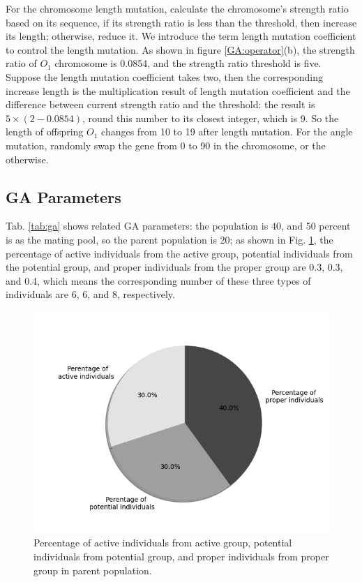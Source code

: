 For the chromosome length mutation, calculate the chromosome's strength ratio
based on its sequence, if its strength ratio is less than the threshold, then
increase its length; otherwise, reduce it. We introduce the term length
mutation coefficient to control the length mutation.  As shown in figure
\ref{GA:operator}(b), the strength ratio of $O_1$ chromosome is 0.0854, and the
strength ratio threshold is five. Suppose the length mutation coefficient takes
two, then the corresponding increase length is the multiplication result of
length mutation coefficient and the difference between current strength ratio
and the threshold: the result is $5\times(2-0.0854)$, round this number to its
closest integer, which is 9. So the length of offspring $O_1$ changes from 10
to 19 after length mutation.  For the angle mutation, randomly swap the gene
from 0 to 90 in the chromosome, or the otherwise.


\subsection{GA Parameters}
Tab. \ref{tab:ga} shows related GA parameters: the population is 40, and 50
percent is as the mating pool, so the parent population is 20; as
shown in Fig. \ref{fig:percentage}, the percentage of active individuals from
the active group, potential individuals from the potential group, and proper
individuals from the proper group are 0.3, 0.3, and 0.4, which means the
corresponding number of these three types of individuals are 6, 6, and 8,
respectively.

\begin{figure}[!tb]
	\centering
	\includegraphics[width=\linewidth]{Figures/chapter4/part1/fig/percentage_of_groups}
	\caption{Percentage of active individuals from active group, potential
	  individuals from potential group, and proper individuals from proper group
	 in parent population.}
	 \label{fig:percentage}
\end{figure}



